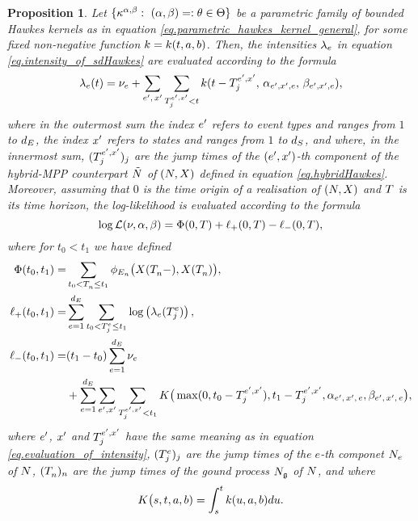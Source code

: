 \documentclass[10pt]{article}
\newtheorem{prop}[thm]{Proposition}
\begin{document}
\begin{prop}\label{prop.parametric_hawkes_kernels}
 Let $\lbrace\hawkesKernel^{\impCoef, \decCoef} : \, \, (\impCoef,\decCoef)=:\theta \in \Theta \rbrace$ be a parametric family of bounded Hawkes kernels as in equation \eqref{eq.parametric_hawkes_kernel_general}, for some fixed non-negative function $\parametricHawkesKernel=\parametricHawkesKernel(t,a,b)$. Then, the intensities $\intensity[e]$ in equation \eqref{eq.intensity_of_sdHawkes} are evaluated according to the formula
 \begin{equation}\label{eq.evaluation_of_intensity}
 \intensity(t) = \baseRate_e 
 +\sum_{\eone, \, \xone} \sum_{\arrivalTimes[\eone, \xone]_{j} < t} 
 \parametricHawkesKernel(t-\arrivalTimes[\eone, \xone]_{j}, \, \impCoef_{\eone,\xone, e}, \,  \decCoef_{\eone,\xone, e}),
\end{equation}
where in the outermost sum the index $\eone$ refers to event types and ranges from $1$ to $\numEventTypes$, the index $\xone$ refers to states and ranges from $1$ to $\numStates$, and where, in the innermost sum, $(\arrivalTimes[\eone, \xone]_{j})_j$ are the jump times of the $(\eone, \xone)$-th component of the hybrid-MPP counterpart $\hybridHawkes$ of $(\multiCountingProc,\stateVariable)$ defined in equation \eqref{eq.hybridHawkes}. Moreover, assuming that $0$ is the time origin of a realisation of $(\multiCountingProc, \stateVariable)$ and $\timeHorizon$ is its time horizon,  the log-likelihood is evaluated according to the formula
\begin{equation}\label{eq.evaluation_of_loglikelihood}
 \log \likelihood(\baseRate,\impCoef,\decCoef) = \Phi(0,\timeHorizon)
 + \lplus(0,\timeHorizon) - \lminus(0,\timeHorizon), 
\end{equation}
where for $t_0 < t_1$ we have defined
\begin{equation*}
\begin{split}
 \Phi(t_0,t_1) =& \sum_{t_0<\arrivalTimes[]_n \leq t_1} \transProb_{\event}\big(\stateVariable(\arrivalTimes[]_n - ), \stateVariable(\arrivalTimes[]_n)\big), 
 \\
 \lplus(t_0,t_1) =& \sum_{e=1}^{\numEventTypes} \sum_{t_0<\arrivalTimes[e]_j\leq t_1} \log \left(\intensity[e](\arrivalTimes[e]_j)\right), 
 \\
 \lminus(t_0,t_1) =& (t_1-t_0)\sum_{e=1}^{\numEventTypes} \baseRate_e
 \\
 & +\sum_{e=1}^{\numEventTypes} 
 \sum_{\eone,\xone} \sum_{\arrivalTimes[\eone,\xone]_j < t_1}
 K\big(\max(0,t_0-\arrivalTimes[\eone,\xone]_j), t_1 - \arrivalTimes[\eone,\xone]_j,  \impCoef\subscriptexe, \decCoef\subscriptexe\big),
\end{split}
 \end{equation*}
where $\eone$, $\xone$ and $\arrivalTimes[\eone,\xone]_j$ have the same meaning as in equation \eqref{eq.evaluation_of_intensity}, $(\arrivalTimes[e]_j)_j$ are the jump times of the $e$-th componet $\countingProc$ of $\multiCountingProc$, $(\arrivalTimes[]_n)_n$ are the jump times of the gound process $\groundProc$ of  $\multiCountingProc$, and where 
\begin{equation*}
 K\big(s,t, a, b) = \int_{s}^{t} \parametricHawkesKernel(u,a,b)du.
\end{equation*}
\end{prop}
\end{document}
